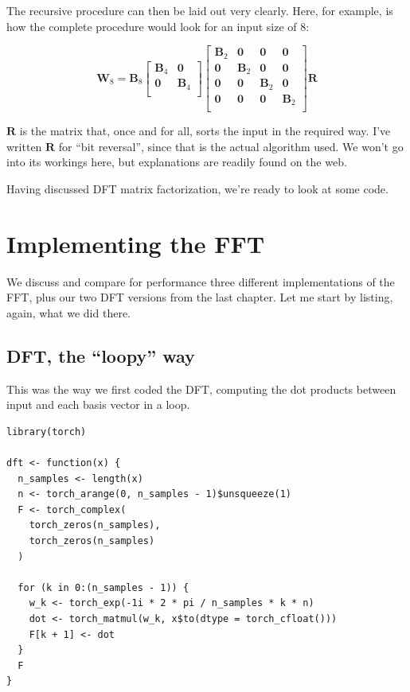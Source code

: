 \documentclass[
  letterpaper,
]{krantz}
\begin{document}
The recursive procedure can then be laid out very clearly. Here, for
example, is how the complete procedure would look for an input size of
8:

\[
\mathbf{W}_8
=
\mathbf{B}_8
\begin{bmatrix}
 \mathbf{B}_4 &  \mathbf{0}\\
 \mathbf{0} &  \mathbf{B}_4\\
\end{bmatrix}
\begin{bmatrix}
\mathbf{B}_2 &   \mathbf{0}  & \mathbf{0} &  \mathbf{0}\\
\mathbf{0} &   \mathbf{B}_2  &  \mathbf{0} &  \mathbf{0}\\
\mathbf{0} &   \mathbf{0}  & \mathbf{B}_2 &  \mathbf{0}\\
\mathbf{0} &   \mathbf{0}  & \mathbf{0} &  \mathbf{B}_2\\
\end{bmatrix}
\mathbf{R}
\]

\(\mathbf{R}\) is the matrix that, once and for all, sorts the input in
the required way. I've written \(\mathbf{R}\) for ``bit reversal'',
since that is the actual algorithm used. We won't go into its workings
here, but explanations are readily found on the web.

Having discussed DFT matrix factorization, we're ready to look at some
code.

\hypertarget{implementing-the-fft}{%
\section{\texorpdfstring{Implementing the
FFT}{Implementing the FFT}}\label{implementing-the-fft}}

We discuss and compare for performance three different implementations
of the FFT, plus our two DFT versions from the last chapter. Let me
start by listing, again, what we did there.

\hypertarget{dft-the-loopy-way}{%
\subsection{DFT, the ``loopy'' way}\label{dft-the-loopy-way}}

This was the way we first coded the DFT, computing the dot products
between input and each basis vector in a loop.

\begin{verbatim}
library(torch)

dft <- function(x) {
  n_samples <- length(x)
  n <- torch_arange(0, n_samples - 1)$unsqueeze(1)
  F <- torch_complex(
    torch_zeros(n_samples),
    torch_zeros(n_samples)
  )

  for (k in 0:(n_samples - 1)) {
    w_k <- torch_exp(-1i * 2 * pi / n_samples * k * n)
    dot <- torch_matmul(w_k, x$to(dtype = torch_cfloat()))
    F[k + 1] <- dot
  }
  F
}
\end{verbatim}
\end{document}
